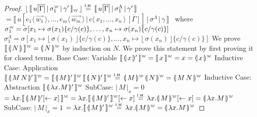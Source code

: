 \documentclass[a4paper,UKenglish,cleveref, autoref]{lipics-v2019}
\newcommand{\abs}[2]{\lambda #1 . #2}
\newcommand{\app}[2]{#1 \, #2}
\newcommand{\share}[3]{#1 [#2 \leftarrow #3]}
\newcommand{\dist}[5]{#1 [ #2 \, \vert \, \fakedist{#4}{#5} \, #3 ]}
\newcommand{\fakedist}[2]{#1 \langle \, #2 \, \rangle}
\newcommand{\size}[1]{\vert \, #1 \, \vert}
\newcommand{\sub}[3]{#1 \{ #2 / #3 \}}
\newcommand{\compile}[1]{\llparenthesis \, #1 \, \rrparenthesis}
\newcommand{\weaksymbol}{\mbox{\tiny $\mathcal{W}$}}
\newcommand{\readbackwmap}[3]{\llbracket \, #1 \, \vert \, #2 \, \vert \, #3  \, \rrbracket }
\newcommand{\readweakwmap}[3]{\llbracket \, #1 \, \vert \, #2 \, \vert \, #3  \, \rrbracket_{\weaksymbol} }
\newcommand{\compweak}[1]{\llparenthesis \, #1 \, \rrparenthesis^{\weaksymbol}}
\newcommand{\readbackweak}[1]{\lfloor \, #1 \, \rfloor}
\newcommand{\composeweak}[1]{\llbracket \, #1 \, \rrbracket^{\weaksymbol}}
\newcommand{\IH}{\stackrel{\hbox{\tiny I.H.}}{\hbox{=}}}
\begin{document}
\begin{proof}
\newline
$\readbackweak{\readweakwmap{u \overline{[\Gamma]}}{\sigma_{1}^{\weaksymbol}}{\gamma'}} \IH \readbackwmap{u \overline{[\Gamma]}}{\sigma_{1}^{\Lambda}}{\gamma'}$
\newline
$= \readbackwmap{\dist{u}{\fakedist{e_{1}}{\vec{w_{1}}}, \dots, \fakedist{e_{m}}{\vec{w_{m}}}}{\overline{[\Gamma]}}{c}{x_{1}, \dots, x_{n}}}{\sigma^{\Lambda}}{\gamma}$\
\newline
where
\newline
$\sigma_{1}^{\weaksymbol} = \sigma [x_{1} \mapsto \sigma(x_{1}) \sub{}{c}{\gamma(c)}, \dots, x_{n} \mapsto \sigma(x_{n})  \sub{}{c}{\gamma(c)}]$
\newline
$\sigma_{1}^{\Lambda} = \sigma [x_{1} \mapsto \readbackweak{\sigma(x_{1})} \sub{}{c}{\gamma(c)}, \dots, x_{n} \mapsto \readbackweak{\sigma(x_{n})}  \sub{}{c}{\gamma(c)}]$
\newline
\newline
We prove $\composeweak{\compile{N}} = \compweak{N}$ by induction on $N$. We prove this statement by first proving it for closed terms.
\newline
\newline
Base Case: Variable
\newline
$\composeweak{\compile{x}'} = \composeweak{x} =  x = \compweak{x}$
\newline
\newline
Inductive Case: Application
\newline
$\composeweak{\compile{\app{M}{N}}'}= \app{\composeweak{\compile{M}'}}{\composeweak{\compile{N}'}} \IH \app{\compweak{M}}{\compweak{N}} = \compweak{\app{M}{N}} $
\newline
\newline
Inductive Case: Abstraction
\newline
$\composeweak{\compile{\abs{x}{M}}'}$
\newline
\indent SubCase: $\size{M}_{x} = 0$
\newline
\indent $= \abs{x}{\composeweak{\compile{M}' \share{}{}{x}}} = \abs{x}{\composeweak{\compile{M}'} \share{}{}{x}} \IH \abs{x}{\compweak{M} \share{}{}{x}} = \compweak{\abs{x}{M}}$
\newline
\newline
\indent SubCase: $\size{M}_{x} = 1$
\newline
\indent $= \abs{x}{\composeweak{\compile{M}'}} \IH \abs{x}{\compweak{M}} = \compweak{\abs{x}{M}}$
\newline
\newline

\end{proof}
\end{document}
